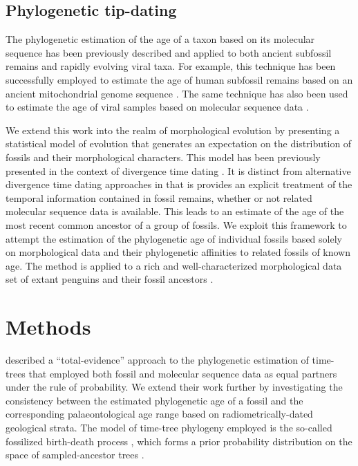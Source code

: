 \documentclass[11pt]{article}
\begin{document}
\subsection*{Phylogenetic tip-dating}

The phylogenetic estimation of the age of a taxon based on its molecular sequence has been previously described \autocite{drummond2002computational,shapiro2011bayesian} and applied to both ancient subfossil remains and rapidly evolving viral taxa. For example, this technique has been successfully employed to estimate the age of human subfossil remains based on an ancient mitochondrial genome sequence \autocite{meyer2014mitochondrial}. The same technique has also been used to estimate the age of viral samples based on molecular sequence data \autocite[e.g.][]{gray2013evolutionary}.

We extend this work into the realm of morphological evolution by presenting a statistical model of evolution that generates an expectation on the distribution of fossils and their morphological characters. This model has been previously presented in the context of divergence time dating \autocite{gavr2014,gavryushkina2015bayesian}. It is distinct from alternative divergence time dating approaches in that is provides an explicit treatment of the temporal information contained in fossil remains, whether or not related molecular sequence data is available. This leads to an estimate of the age of the most recent common ancestor of a group of fossils. We exploit this framework to attempt the estimation of the phylogenetic age of individual fossils based solely on morphological data and their phylogenetic affinities to related fossils of known age. The method is applied to a rich and well-characterized morphological data set of extant penguins and their fossil ancestors \autocite{ksepka2010,ksepka2012}.

\section*{Methods}

\textcite{gavryushkina2015bayesian} described a ``total-evidence'' approach to the phylogenetic estimation of time-trees that employed both fossil and molecular sequence data as equal partners under the rule of probability. We extend their work further by investigating the consistency between the estimated phylogenetic age of a fossil and the corresponding palaeontological age range based on radiometrically-dated geological strata. The model of time-tree phylogeny employed is the so-called fossilized birth-death process \autocite{Heath2014}, which forms a prior probability distribution on the space of sampled-ancestor trees \autocite{Gavr2013}.
\end{document}
